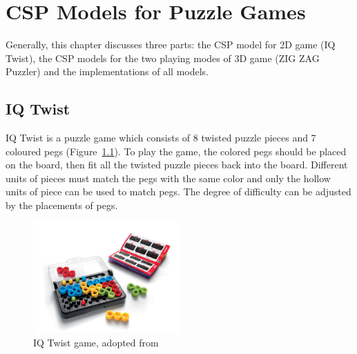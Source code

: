 \chapter{CSP Models for Puzzle Games}
\label{cha:design}
Generally, this chapter discusses three parts: the CSP model for 2D game (IQ Twist), the CSP models for the two playing modes of 3D game (ZIG ZAG Puzzler) and the implementations of all models.
\section{IQ Twist}
IQ Twist is a puzzle game which consists of 8 twisted puzzle pieces and 7 coloured pegs (Figure~\ref{fig:IQ_twist_game}). To play the game, the colored pegs should be placed on the board, then fit all the twisted puzzle pieces back into the board. Different units of pieces must match the pegs with the same color and only the hollow units of piece can be used to match pegs. The degree of difficulty can be adjusted by the placements of pegs.
\begin{figure}[htbp]
    \centering
    \includegraphics[width=0.5\textwidth]{figs/IQtwistintroduction.jpg}
    \caption{IQ Twist game, adopted from~\cite{r21}}
    \label{fig:IQ_twist_game}
\end{figure}
